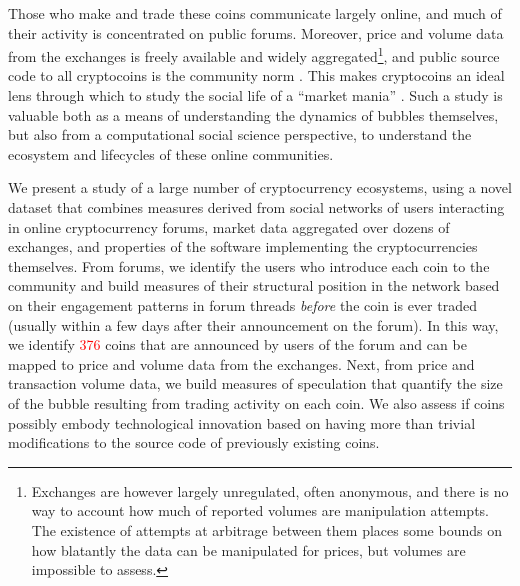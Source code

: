 Those who make and trade these coins communicate largely online, and much of their activity is concentrated on public forums. 
Moreover, price and volume data from the exchanges is freely available and widely aggregated\footnote{Exchanges are however largely unregulated, often anonymous, and there is no way to account how much of reported volumes are manipulation attempts. The existence of attempts at arbitrage between them places some bounds on how blatantly the data can be manipulated for prices, but volumes are impossible to assess. },
and public source code to all cryptocoins is the community norm%
. This makes cryptocoins
an ideal lens through which to study the social life of a ``market mania'' \cite{cosma2008}.
Such a study is valuable both as a means of understanding the dynamics of bubbles themselves, but also from a computational social science perspective, to understand the ecosystem and lifecycles of these online communities.

We present a study of a large number of cryptocurrency ecosystems, 
using a novel dataset that combines measures derived from social networks of users interacting in online cryptocurrency forums, market data aggregated over dozens of exchanges, and properties of the software implementing the cryptocurrencies themselves.
From forums, we identify the users who introduce each coin to the community and build measures of their structural position in the network based on
their engagement patterns in forum threads \emph{before} the coin is ever traded (usually within a few days after their announcement on the forum).
In this way, we identify \textcolor{red}{376} coins that are announced by users of the forum and can be mapped to price and volume data from the exchanges.
Next, from price and transaction volume data, we build measures of speculation that quantify the size of the bubble resulting from trading activity on each coin. 
We also assess if coins possibly embody technological innovation based on having more than trivial modifications to the source code of previously existing coins.



